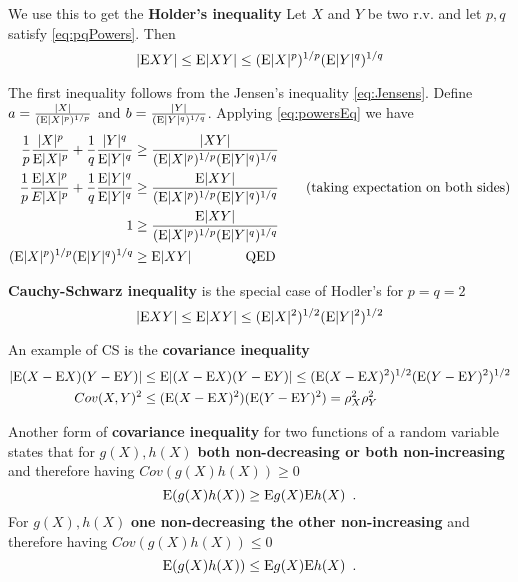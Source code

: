 We use this to get the \textbf{Holder's inequality} Let $X$ and $Y$ be two r.v. and let $p, q$ satisfy \eqref{eq:pqPowers}.
Then 
\begin{equation}\label{eq:Holders}
|\mathrm{E} XY| \leq \mathrm{E} |XY| \leq (\mathrm{E}|X|^p)^{1/p} (\mathrm{E}|Y|^q)^{1/q}
\end{equation}

\begin{prf}
The first inequality follows from the Jensen's inequality \eqref{eq:Jensens}. 
Define $a = \frac{|X|}{(\mathrm{E}|X|^p)^{1/p}}$ and $b = \frac{|Y|}{(\mathrm{E}|Y|^q)^{1/q}}$.
Applying \eqref{eq:powersEq} we have
\begin{align*}
\frac{1}{p}\frac{|X|^p}{\mathrm{E}|X|^p} + \frac{1}{q}\frac{|Y|^q}{\mathrm{E}|Y|^q} & \geq \frac{|XY|}{(\mathrm{E}|X|^p)^{1/p} (\mathrm{E}|Y|^q)^{1/q}} \nonumber \\
\frac{1}{p}\frac{\mathrm{E}|X|^p}{E|X|^p} + \frac{1}{q}\frac{\mathrm{E}|Y|^q}{\mathrm{E}|Y|^q} & \geq \frac{\mathrm{E}|XY|}{(\mathrm{E}|X|^p)^{1/p} (\mathrm{E}|Y|^q)^{1/q}} \qquad \text{(taking expectation on both sides)} \nonumber \\
1 & \geq \frac{\mathrm{E}|XY|}{(\mathrm{E}|X|^p)^{1/p} (\mathrm{E}|Y|^q)^{1/q}} \nonumber \\
(\mathrm{E}|X|^p)^{1/p} (\mathrm{E}|Y|^q)^{1/q} & \geq \mathrm{E}|XY| \qquad \qquad \text{QED}
\end{align*}
\end{prf}

\textbf{Cauchy-Schwarz inequality} is the special case of Hodler's for $p=q=2$
\begin{equation}\label{eq:CS}
|\mathrm{E} XY| \leq \mathrm{E} |XY| \leq (\mathrm{E}|X|^2)^{1/2} (\mathrm{E}|Y|^2)^{1/2}
\end{equation}

An example of CS is the \textbf{covariance inequality}
\begin{align}
|\mathrm{E} (X-\mathrm{E} X)(Y-\mathrm{E} Y)| & \leq \mathrm{E} |(X-\mathrm{E} X)(Y-\mathrm{E} Y)| \leq (\mathrm{E} (X-\mathrm{E} X)^2)^{1/2} (\mathrm{E} (Y-\mathrm{E} Y)^2)^{1/2} \nonumber \\
Cov(X,Y)^2 & \leq (\mathrm{E} (X-\mathrm{E} X)^2) (\mathrm{E} (Y-\mathrm{E} Y)^2) = \rho_X^2 \rho_Y^2
\end{align}

Another form of \textbf{covariance inequality} for two functions of a random variable states that
for $g(X), h(X)$ \textbf{both non-decreasing or both non-increasing} and therefore having $Cov(g(X)h(X)) \geq 0$
\begin{equation}
\mathrm{E}(g(X)h(X)) \geq \mathrm{E} g(X) \mathrm{E} h(X) \enspace .
\end{equation}
For $g(X), h(X)$ \textbf{one non-decreasing the other non-increasing} and therefore having $Cov(g(X)h(X)) \leq 0$
\begin{equation}
\mathrm{E}(g(X)h(X)) \leq \mathrm{E} g(X) \mathrm{E} h(X) \enspace .
\end{equation}

